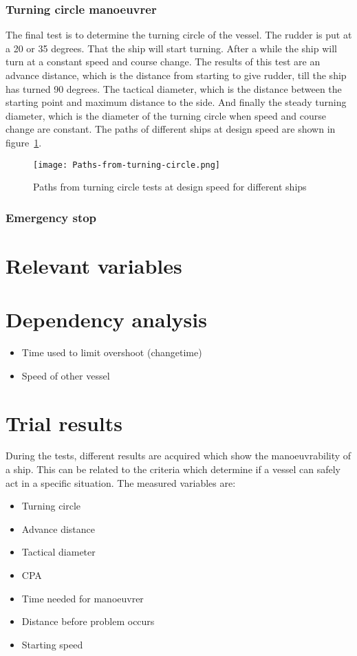 \subsubsection{Turning circle manoeuvrer}
The final test is to determine the turning circle of the vessel. The rudder is put at a 20 or 35 degrees. That the ship will start turning. After a while the ship will turn at a constant speed and course change. The results of this test are an advance distance, which is the distance from starting to give rudder, till the ship has turned 90 degrees. The tactical diameter, which is the distance between the starting point and maximum distance to the side. And finally the steady turning diameter, which is the diameter of the turning circle when speed and course change are constant. The paths of different ships at design speed are shown in figure~\ref{fig:turning-circle}.

\begin{figure}[hb]
	\centering
	\texttt{[image: Paths-from-turning-circle.png]}
	\caption{Paths from turning circle tests at design speed for different ships}
	\label{fig:turning-circle}
\end{figure}

\subsubsection{Emergency stop}


\section{Relevant variables}


\section{Dependency analysis}
\begin{itemize}
	\item Time used to limit overshoot (changetime)
	\item Speed of other vessel
\end{itemize}

\section{Trial results}
During the tests, different results are acquired which show the manoeuvrability of a ship. This can be related to the criteria which determine if a vessel can safely act in a specific situation. The measured variables are:
\begin{itemize}
	\item Turning circle
	\item Advance distance
	\item Tactical diameter
	\item \acf{CPA}
	\item Time needed for manoeuvrer
	\item Distance before problem occurs
	\item Starting speed
\end{itemize}


